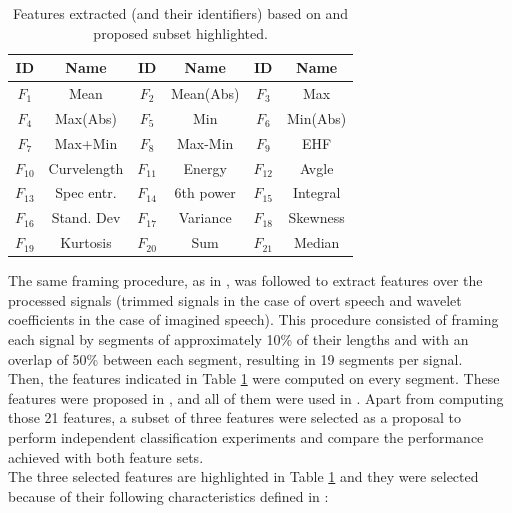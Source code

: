 \begin{table}[h!]
	\caption{Features extracted (and their identifiers) based on \cite{d2003epileptic} and proposed subset highlighted.}
	\centering
	\begin{tabular}{|c|c|c|c|c|c|}\hline
		\textbf{ID}&\textbf{Name}&\textbf{ID}&\textbf{Name}&\textbf{ID}&\textbf{Name}\\\hline
		$F_{1}$&Mean&$F_{2}$&Mean(Abs)&$F_{3}$&Max\\\hline
		$F_{4}$&Max(Abs)&$F_{5}$&Min&$F_{6}$&Min(Abs)\\\hline
		$F_{7}$&Max+Min&$F_{8}$&Max-Min&$F_{9}$&EHF\\\hline
		\cellcolor{orange}$F_{10}$&\cellcolor{orange}Curvelength&$F_{11}$&Energy&\cellcolor{orange}$F_{12}$&\cellcolor{orange}Avgle\\\hline
		\cellcolor{orange}$F_{13}$&\cellcolor{orange}Spec entr.&$F_{14}$&6th power&$F_{15}$&Integral\\\hline
		$F_{16}$&Stand. Dev&$F_{17}$&Variance&$F_{18}$&Skewness\\\hline
		$F_{19}$&Kurtosis&$F_{20}$&Sum&$F_{21}$&Median\\\hline
	\end{tabular}
	\label{Table: Feature_Extraction}
\end{table}

The same framing procedure, as in \cite{zhao2015classifying}, was followed to extract features over the processed signals (trimmed signals in the case of overt speech and wavelet coefficients in the case of imagined speech). This procedure consisted of framing each signal by segments of approximately 10\% of their lengths and with an overlap of 50\% between each segment, resulting in 19 segments per signal.\\

Then, the features indicated in Table \ref{Table: Feature_Extraction} were computed on every segment. These features were proposed in \cite{d2003epileptic}, and all of them were used in \cite{zhao2015classifying,zhao2013combining}. Apart from computing those 21 features, a subset of three features were selected as a proposal to perform independent classification experiments and compare the performance achieved with both feature sets.\\

The three selected features are highlighted in Table \ref{Table: Feature_Extraction} and they were selected because of their following characteristics defined in \cite{d2003epileptic}:\\

